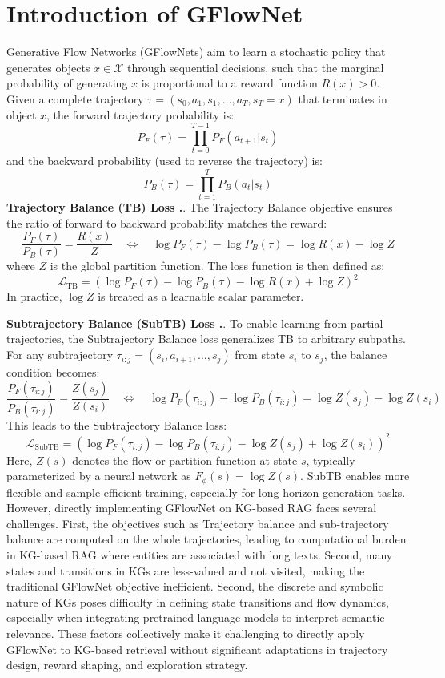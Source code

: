 \documentclass{article}
\newcommand{\xhdr}[1]{{\vspace{1pt}\noindent\bfseries #1}.}
\begin{document}
\begin{enumerate}
\end{enumerate}

\appendix

\section{Introduction of GFlowNet}

Generative Flow Networks (GFlowNets) \cite{bengio2023gflownet} aim to learn a stochastic policy that generates objects $x \in \mathcal{X}$ through sequential decisions, such that the marginal probability of generating $x$ is proportional to a reward function $R(x) > 0$. Given a complete trajectory $\tau = (s_0, a_1, s_1, \dots, a_T, s_T = x)$ that terminates in object $x$, the forward trajectory probability is:
\[
P_F(\tau) = \prod_{t=0}^{T-1} P_F(a_{t+1} | s_t)
\]
and the backward probability (used to reverse the trajectory) is:
\[
P_B(\tau) = \prod_{t=1}^{T} P_B(a_{t} | s_{t})
\]
\xhdr{Trajectory Balance (TB) Loss \cite{malkin2022trajectory}.} The Trajectory Balance objective ensures the ratio of forward to backward probability matches the reward:
\[
\frac{P_F(\tau)}{P_B(\tau)} = \frac{R(x)}{Z}
\quad \Longleftrightarrow \quad
\log P_F(\tau) - \log P_B(\tau) = \log R(x) - \log Z
\]
where $Z$ is the global partition function. The loss function is then defined as:
\[
\mathcal{L}_{\text{TB}} = \left( \log P_F(\tau) - \log P_B(\tau) - \log R(x) + \log Z \right)^2
\]
In practice, $\log Z$ is treated as a learnable scalar parameter.

\xhdr{Subtrajectory Balance (SubTB) Loss \cite{madan2023learning}.}
To enable learning from partial trajectories, the Subtrajectory Balance loss generalizes TB to arbitrary subpaths. For any subtrajectory $\tau_{i:j} = (s_i, a_{i+1}, \dots, s_j)$ from state $s_i$ to $s_j$, the balance condition becomes:
\[
\frac{P_F(\tau_{i:j})}{P_B(\tau_{i:j})} = \frac{Z(s_j)}{Z(s_i)}
\quad \Longleftrightarrow \quad
\log P_F(\tau_{i:j}) - \log P_B(\tau_{i:j}) = \log Z(s_j) - \log Z(s_i)
\]
This leads to the Subtrajectory Balance loss:
\[
\mathcal{L}_{\text{SubTB}} = \left( \log P_F(\tau_{i:j}) - \log P_B(\tau_{i:j}) - \log Z(s_j) + \log Z(s_i) \right)^2
\]
Here, $Z(s)$ denotes the flow or partition function at state $s$, typically parameterized by a neural network as $F_\phi(s) = \log Z(s)$. SubTB enables more flexible and sample-efficient training, especially for long-horizon generation tasks.
However, directly implementing GFlowNet on KG-based RAG faces several challenges. 
First, the objectives such as Trajectory balance and sub-trajectory balance are computed on the whole trajectories, leading to computational burden in KG-based RAG where entities are associated with long texts.
Second, many states and transitions in KGs are less-valued and not visited, making the traditional GFlowNet objective inefficient.
Second, the discrete and symbolic nature of KGs poses difficulty in defining state transitions and flow dynamics, especially when integrating pretrained language models to interpret semantic relevance. These factors collectively make it challenging to directly apply GFlowNet to KG-based retrieval without significant adaptations in trajectory design, reward shaping, and exploration strategy.
\end{document}
